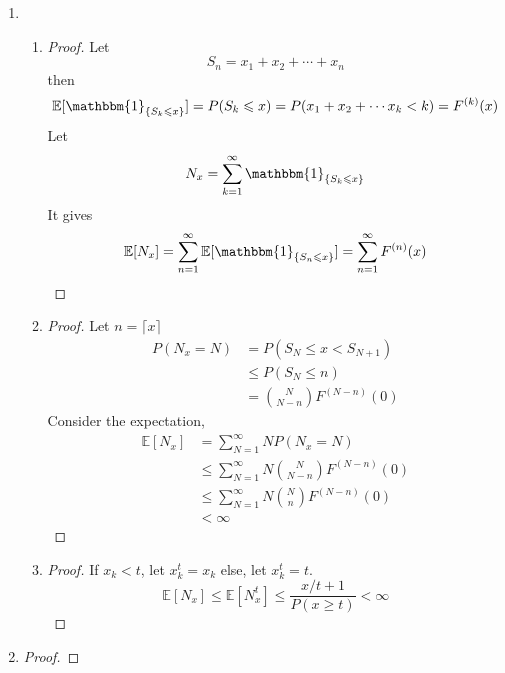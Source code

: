 \documentclass{article}
\begin{document}
\begin{enumerate}
        \item \begin{enumerate}
            \item \begin{proof} 
                Let $$S_n=x_1+x_2+\cdots+x_n$$
                then $$\mathbb{E}[\mathbbm{1}_{\{S_k\leqslant x\}}]
                =P(S_k\leqslant x)
                =P(x_1+x_2+\cdots x_k<k)
                =F^{(k)}(x)$$
                Let $$N_x=\sum_{k=1}^{\infty}\mathbbm{1}_{\{S_k\leqslant x\}}$$
                It gives
                $$\mathbb{E}[N_x]=\sum_{n=1}^{\infty}\mathbb{E}[\mathbbm{1}_{\{S_n\leqslant x\}}]=\sum_{n=1}^{\infty}F^{(n)}(x)$$
            \end{proof}
            \item \begin{proof}
            Let $n=\lceil x \rceil$
               \begin{align*}
                   P(N_x=N)&=P(S_N \leqslant x <S_{N+1})\\
                   &\leqslant P(S_N \leqslant n)\\
                   &=\binom{N}{N-n}F^{(N-n)}(0)
               \end{align*}
               Consider the expectation,
               \begin{align*}
                   \mathbb{E}[N_x]&=\sum_{N=1}^{\infty}NP(N_x=N)\\
                   &\leqslant \sum_{N=1}^\infty N\binom{N}{N-n}F^{(N-n)}(0)\\
                   &\leqslant \sum_{N=1}^{\infty}N\binom{N}{n}F^{(N-n)}(0)\\
                   &<\infty
               \end{align*}
            \end{proof}
            \item \begin{proof}
                If $x_k < t$, let $x_k^t=x_k$ else, let $x_k^t=t$.
                $$\mathbb{E}[N_x]\leqslant\mathbb{E}[N_x^t]
                \leqslant \frac{x/t+1}{P(x\geqslant t)}<\infty$$
            \end{proof}
            \end{enumerate}


        \item \begin{proof}
            
        \end{proof}
    
    \end{enumerate}
\end{document}
